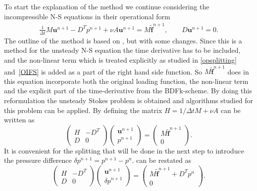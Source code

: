 To start the explanation of the method we continue considering the incompressible N-S equations in their 
operational form 
\begin{align}
    \frac{1}{\Delta t} M \mathbf{u}^{n+1}-D^Tp^{n+1}+\nu A \mathbf{u}^{n+1} = M\mathbf{\tilde f}^{n+1},
    \qquad D\mathbf{u}^{n+1}    = 0.
    \label{eq:DiscreteStart}
\end{align}
The outline of the method is based on , but with some changes. Since this 
is a method for the unsteady N-S equation the time derivative has to be included, and the 
non-linear term which is treated explicitly as studied in \cref{opsplitting} and~\ref{OIFS}
is added as a part of the right hand side function. So $M\mathbf{\tilde f}^{n+1}$ does in this equation 
incorporate both the original loading function, the non-linear term and the explicit part of the 
time-derivative from the BDFk-scheme. 
By doing this reformulation the unsteady Stokes problem is obtained and algorithms studied 
for this problem can be applied.
By defining the matrix $H = 1/\Delta t M + \nu A$  
can be written as 
\begin{equation}
\begin{pmatrix}
    H & -D^T \\ 
    D & 0
\end{pmatrix}
\begin{pmatrix}
    \mathbf{u}^{n+1}  \\ 
    p^{n+1} 
\end{pmatrix}
=
\begin{pmatrix}
    M\mathbf{\tilde f}^{n+1}  \\ 
    0 
    \end{pmatrix}.
    \label{eq:Matform}
\end{equation}
It is convenient for the splitting that will be done in the next step to introduce the 
pressure difference $\delta p^{n+1} = p^{n+1}-p^n$.  can be restated as 
\begin{equation}
\begin{pmatrix}
    H & -D^T \\ 
    D & 0
\end{pmatrix}
\begin{pmatrix}
    \mathbf{u}^{n+1}  \\ 
    \delta p^{n+1} 
\end{pmatrix}
=
\begin{pmatrix}
    M\mathbf{\tilde f}^{n+1} +D^Tp^n  \\ 
    0 
    \end{pmatrix}.
    \label{eq:Matform}
\end{equation}

